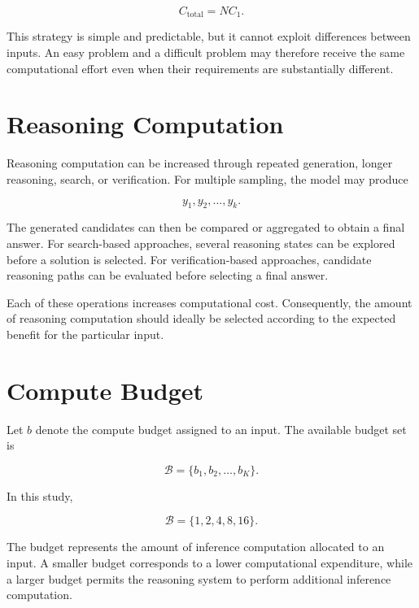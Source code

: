 \documentclass[12pt,a4paper,titlepage]{report}
\begin{document}
\begin{equation}
C_{\mathrm{total}}=NC_1.
\end{equation}

This strategy is simple and predictable, but it cannot exploit differences between inputs. An easy problem and a difficult problem may therefore receive the same computational effort even when their requirements are substantially different.

\section{Reasoning Computation}

Reasoning computation can be increased through repeated generation, longer reasoning, search, or verification. For multiple sampling, the model may produce

\begin{equation}
y_1,y_2,\ldots,y_k.
\end{equation}

The generated candidates can then be compared or aggregated to obtain a final answer. For search-based approaches, several reasoning states can be explored before a solution is selected. For verification-based approaches, candidate reasoning paths can be evaluated before selecting a final answer.

Each of these operations increases computational cost. Consequently, the amount of reasoning computation should ideally be selected according to the expected benefit for the particular input.

\section{Compute Budget}

Let $b$ denote the compute budget assigned to an input. The available budget set is

\begin{equation}
\mathcal{B}
=
\{b_1,b_2,\ldots,b_K\}.
\end{equation}

In this study,

\begin{equation}
\mathcal{B}
=
\{1,2,4,8,16\}.
\end{equation}

The budget represents the amount of inference computation allocated to an input. A smaller budget corresponds to a lower computational expenditure, while a larger budget permits the reasoning system to perform additional inference computation.
\end{document}
